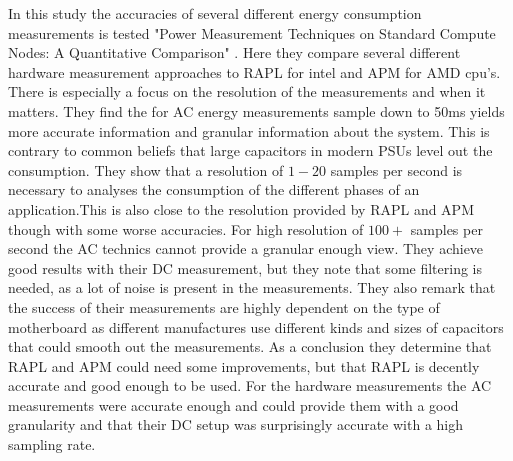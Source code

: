 In this study the accuracies of several different energy consumption measurements is tested "Power Measurement Techniques on Standard
Compute Nodes: A Quantitative Comparison" \cite{hackenberg2013}. Here they compare several different hardware measurement approaches to RAPL for intel and APM for AMD cpu's. There is especially a focus on the resolution of the measurements and when it matters. They find the for AC energy measurements sample down to 50ms yields more accurate information and granular information about the system. This is contrary to common beliefs that large capacitors in modern PSUs level out the consumption. They show that a resolution of $1-20$ samples per second is necessary to analyses the consumption of the different phases of an application.This is also close to the resolution provided by RAPL and APM though with some worse accuracies. For high resolution of $100+$ samples per second the AC technics cannot provide a granular enough view. They achieve good results with their DC measurement, but they note that some filtering is needed, as a lot of noise is present in the measurements. They also remark that the success of their measurements are highly dependent on the type of motherboard as different manufactures use different kinds and sizes of capacitors that could smooth out the measurements. As a conclusion they determine that RAPL and APM could need some improvements, but that RAPL is decently accurate and good enough to be used. For the hardware measurements the AC measurements were accurate enough and could provide them with a good granularity and that their DC setup was surprisingly accurate with a high sampling rate.